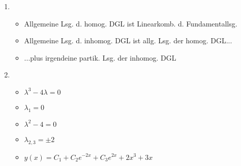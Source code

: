 \item
	\begin{enumerate}
	
	\item
		\begin{itemize}
			\item Allgemeine Lsg. d. homog. DGL ist Linearkomb. d. Fundamentallsg.
			\item Allgemeine Lsg. d. inhomog. DGL ist allg. Lsg. der homog. DGL...
			\item ...plus irgendeine partik. Lsg. der inhomog. DGL
		\end{itemize}
	
	\item
		\begin{itemize}
			\item $ \lambda^3 - 4\lambda = 0$
			\item $ \lambda_1 = 0$
			\item $ \lambda^2 - 4 = 0$
			\item $ \lambda_{2,3} = \pm2$
			\item $ y(x) = C_1 + C_2 e^{-2x} + C_3 e^{2x} + 2x^3 + 3x$
		\end{itemize}
		
	\end{enumerate}
